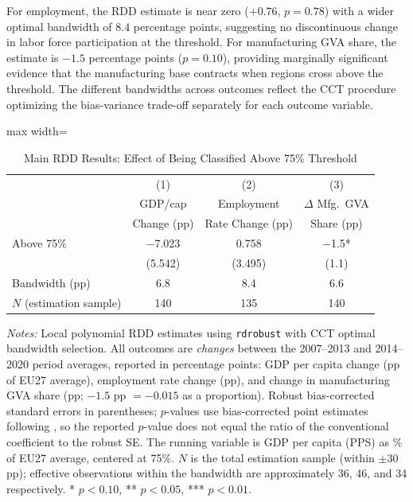 \documentclass[12pt]{article}
\begin{document}
For employment, the RDD estimate is near zero ($+0.76$, $p = 0.78$) with a wider optimal bandwidth of 8.4 percentage points, suggesting no discontinuous change in labor force participation at the threshold. For manufacturing GVA share, the estimate is $-1.5$ percentage points ($p = 0.10$), providing marginally significant evidence that the manufacturing base contracts when regions cross above the threshold. The different bandwidths across outcomes reflect the CCT procedure optimizing the bias-variance trade-off separately for each outcome variable.

\begin{table}[H]
\centering
\caption{Main RDD Results: Effect of Being Classified Above 75\% Threshold}
\label{tab:main_rdd}
\begin{threeparttable}
\begin{adjustbox}{max width=\textwidth}
\begin{tabular}{lccc}
\toprule
 & (1) & (2) & (3) \\
 & GDP/cap & Employment & $\Delta$ Mfg.\ GVA \\
 & Change (pp) & Rate Change (pp) & Share (pp) \\
\midrule
Above 75\% & $-$7.023 & 0.758 & $-$1.5* \\
 & (5.542) & (3.495) & (1.1) \\[6pt]
Bandwidth (pp) & 6.8 & 8.4 & 6.6 \\
$N$ (estimation sample) & 140 & 135 & 140 \\
\bottomrule
\end{tabular}
\end{adjustbox}
\begin{tablenotes}[flushleft]\small
\item \textit{Notes:} Local polynomial RDD estimates using \texttt{rdrobust} with CCT optimal bandwidth selection. All outcomes are \emph{changes} between the 2007--2013 and 2014--2020 period averages, reported in percentage points: GDP per capita change (pp of EU27 average), employment rate change (pp), and change in manufacturing GVA share (pp; $-1.5$ pp $= -0.015$ as a proportion). Robust bias-corrected standard errors in parentheses; $p$-values use bias-corrected point estimates following \citet{CalonicoCattaneoTitiunik2014}, so the reported $p$-value does not equal the ratio of the conventional coefficient to the robust SE. The running variable is GDP per capita (PPS) as \% of EU27 average, centered at 75\%. $N$ is the total estimation sample (within $\pm 30$ pp); effective observations within the bandwidth are approximately 36, 46, and 34 respectively. * $p < 0.10$, ** $p < 0.05$, *** $p < 0.01$.
\end{tablenotes}
\end{threeparttable}
\end{table}
\end{document}
